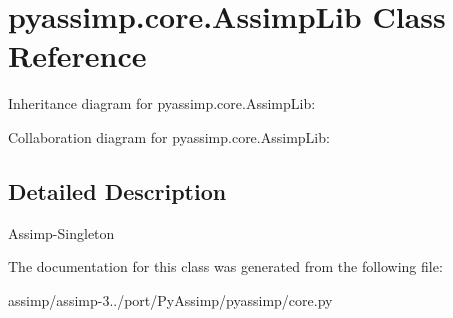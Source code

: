 \hypertarget{classpyassimp_1_1core_1_1_assimp_lib}{\section{pyassimp.\+core.\+Assimp\+Lib Class Reference}
\label{classpyassimp_1_1core_1_1_assimp_lib}
}


Inheritance diagram for pyassimp.\+core.\+Assimp\+Lib\+:


Collaboration diagram for pyassimp.\+core.\+Assimp\+Lib\+:


\subsection{Detailed Description}
\begin{DoxyVerb}Assimp-Singleton
\end{DoxyVerb}
 

The documentation for this class was generated from the following file\+:\begin{DoxyCompactItemize}
\item 
assimp/assimp-\/3../port/\+Py\+Assimp/pyassimp/core.\+py\end{DoxyCompactItemize}
